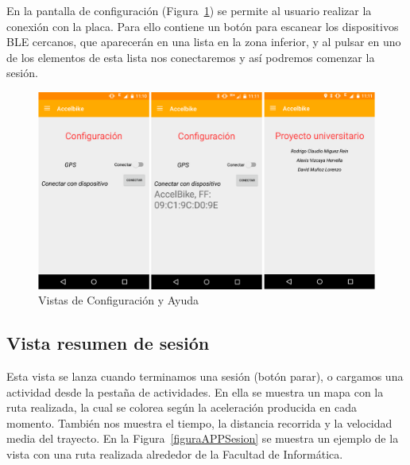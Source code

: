 En la pantalla de configuración (Figura~\ref{figuraAPPConfigAyuda}) se permite al usuario realizar la conexión con la placa. Para ello contiene un botón para escanear los dispositivos BLE cercanos, que aparecerán en una lista en la zona inferior, y al pulsar en uno de los elementos de esta lista nos conectaremos y así podremos comenzar la sesión.

\begin{figure}[h]%
	\centering
    \includegraphics[scale=0.2]{figures/app_config_ayuda.png} %
    \caption[Vista de configuración y de ayuda]{Vistas de Configuración y Ayuda}
   	\label{figuraAPPConfigAyuda}
\end{figure}

\subsection{Vista resumen de sesión}
\label{makereference6.1.3}

Esta vista se lanza cuando terminamos una sesión (botón parar), o cargamos una actividad desde la pestaña de actividades. En ella se muestra un mapa con la ruta realizada, la cual se colorea según la aceleración producida en cada momento. También nos muestra el tiempo, la distancia recorrida y la velocidad media del trayecto. En la Figura~\ref{figuraAPPSesion} se muestra un ejemplo de la vista con una ruta realizada alrededor de la Facultad de Informática.

